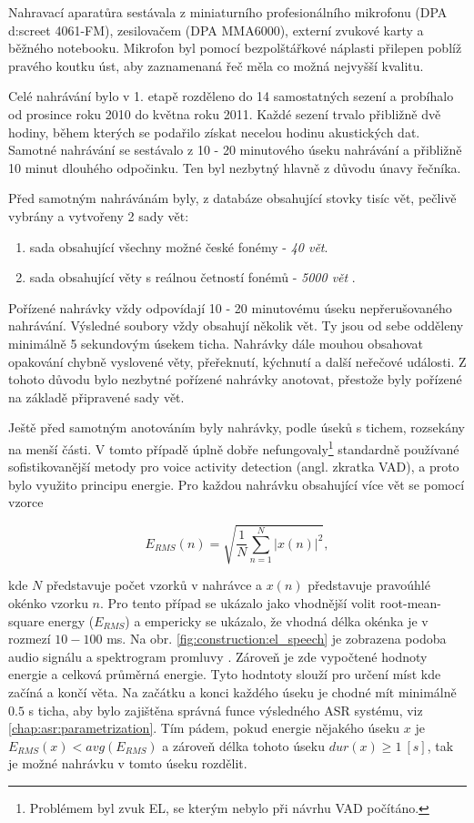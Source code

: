 Nahravací aparatůra sestávala z miniaturního profesionálního mikrofonu (DPA d:screet 4061-FM), zesilovačem (DPA MMA6000), externí zvukové karty a běžného notebooku. Mikrofon byl pomocí bezpolštářkové náplasti přilepen poblíž pravého koutku úst, aby zaznamenaná řeč měla co možná nejvyšší kvalitu.

Celé nahrávání bylo v 1. etapě rozděleno do 14 samostatných sezení a probíhalo od prosince roku 2010 do května roku 2011. Každé sezení trvalo přibližně dvě hodiny, během kterých se podařilo získat necelou hodinu akustických dat. Samotné nahrávání se sestávalo z 10 - 20 minutového úseku nahrávání a přibližně 10 minut dlouhého odpočinku. Ten byl nezbytný hlavně z důvodu únavy řečníka.

Před samotným nahrávánám byly, z databáze obsahující stovky tisíc vět, pečlivě vybrány a vytvořeny 2 sady vět:

\begin{enumerate}
  \item sada obsahující všechny možné české fonémy - \textit{40 vět}.
  \item sada obsahující věty s reálnou četností fonémů - \textit{5000 vět} \cite{Radova2000}.
\end{enumerate}

\noindent Pořízené nahrávky vždy odpovídají 10 - 20 minutovému úseku nepřerušovaného nahrávání. Výsledné soubory vždy obsahují několik vět. Ty jsou od sebe odděleny minimálně 5 sekundovým úsekem ticha. Nahrávky dále mouhou obsahovat opakování chybně vyslovené věty, přeřeknutí, kýchnutí a další neřečové události. Z tohoto důvodu bylo nezbytné pořízené nahrávky anotovat, přestože byly pořízené na základě připravené sady vět.

Ještě před samotným anotováním byly nahrávky, podle úseků s tichem, rozsekány na menší části. V tomto případě úplně dobře nefungovaly\footnote{Problémem byl zvuk EL, se kterým nebylo při návrhu VAD počítáno.} standardně používané sofistikovanější metody pro voice activity detection (angl. zkratka VAD), a proto bylo využito principu energie. Pro každou nahrávku obsahující více vět se pomocí vzorce

\begin{equation}
  \label{eq:construction:energy}
  E_{RMS}(n) = \sqrt{\frac{1}{N} \sum_{n=1}^{N} \left| x(n) \right|^2},
\end{equation}

\noindent kde $N$ představuje počet vzorků v nahrávce a $x(n)$ představuje pravoúhlé okénko vzorku $n$. Pro tento případ se ukázalo jako vhodnější volit root-mean-square energy ($E_{RMS}$) a empericky se ukázalo, že vhodná délka okénka je v rozmezí $10 - 100$ ms. Na obr. \ref{fig:construction:el_speech} je zobrazena podoba audio signálu a spektrogram promluvy \textit{}. Zároveň je zde vypočtené hodnoty energie a celková průměrná energie. Tyto hodntoty slouží pro určení míst kde začíná a končí věta. Na začátku a konci každého úseku je chodné mít minimálně $0.5$ s ticha, aby bylo zajištěna správná funce výsledného ASR systému, viz \ref{chap:asr:parametrization}. Tím pádem, pokud energie nějakého úseku $x$ je $E_{RMS}(x) < avg(E_{RMS})$ a zároveň délka tohoto úseku $dur(x) \geq 1\ [s]$, tak je možné nahrávku v tomto úseku rozdělit.

